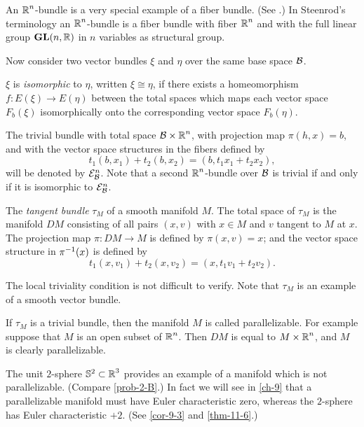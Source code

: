 \begin{remark}
	An $\boldsymbol{\mathbb{R}}^n$-bundle is a very special example of a fiber bundle.
	(See \cite[p. 9]{18}.) In Steenrod's terminology an $\boldsymbol{\mathbb{R}}^n$-bundle is a
	fiber bundle with fiber $\boldsymbol{\mathbb{R}}^n$ and with the full linear group $\mathbf{GL}(n,\boldsymbol{\mathbb{R}})$ in $n$
	variables as structural group.
\end{remark}

Now consider two vector bundles $\xi$ and $\eta$ over the same base space
$\mathcal{B}$.

\begin{definition}\label{def:2-2}
	$\xi$ is \textit{isomorphic} to $\eta$, written $\xi \cong \eta$, if there exists
	a homeomorphism $f\mathpunct{:}E(\xi)\to E(\eta)$ between the total spaces which maps each vector space $F_b(\xi)$ isomorphically onto the corresponding vector space $F_b(\eta)$.
	
\end{definition}

\begin{example}
	The trivial bundle with total space $\mathcal{B} \times \boldsymbol{\mathbb{R}}^n$, with 
	projection map $\pi(h, x) =
	b$, and with the vector space structures in the fibers
	defined by
	\[t_1(b,x_1) +
	t_2(b,x_2) =
	(b,t_1x_1 +
	t_2x_2) ,\]
	will be denoted by $\mathcal{E}^n_{\mathcal{B}}$. Note that a second $\boldsymbol{\mathbb{R}}^n$-bundle over $\mathcal{B}$ is trivial
	if and only if it is isomorphic to $\mathcal{E}^n_{\mathcal{B}}$.
\end{example}

\begin{example}
	The \textit{tangent bundle} $\tau_M$ of a smooth manifold $M$. The
	total space of $\tau_M$ is the manifold $DM$ consisting of all pairs $(x,v)$ with
	$x \in M$ and $v$ tangent to $M$ at $x$. The projection map $\pi\mathpunct{:}DM \to M$
	is defined by $\pi(x, v) =
	x$; and the vector space structure in $\pi^{-1}(x)$ is
	defined by
	\[t_1(x,v_1) +
	t_2(x,v_2) =
	(x,t_1v_1 + t_2v_2). \]
	
	The local triviality condition is not difficult to verify. Note that $\tau_M$ is
	an example of a smooth vector bundle.
\end{example}

If $\tau_M$ is a trivial bundle, then the manifold $M$ is called parallelizable.
For example suppose that $M$ is an open subset of $\boldsymbol{\mathbb{R}}^n$. Then $DM$ is
equal to $M \times \boldsymbol{\mathbb{R}}^n$, and $M$ is clearly parallelizable.

The unit $2$-sphere $\mathbb{S}^{2}\subset \boldsymbol{\mathbb{R}}^3$ provides an example of a manifold which
is not parallelizable. (Compare \cref{prob-2-B}.) In fact we will see in \cref{ch-9}
that a parallelizable manifold must have Euler characteristic zero, whereas
the $2$-sphere has Euler characteristic $+2$. (See \cref{cor-9-3} and \cref{thm-11-6}.)

